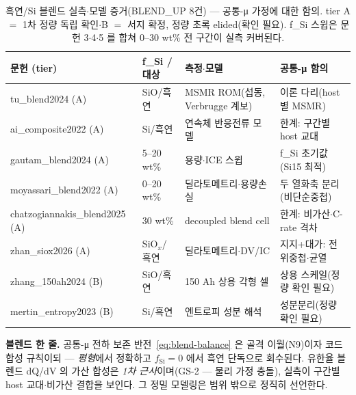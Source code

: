 \begin{table}[h]
\centering\footnotesize
\renewcommand{\arraystretch}{1.3}
\caption{흑연/Si 블렌드 실측$\cdot$모델 증거(BLEND\_UP 8건) --- 공통-μ 가정에 대한 함의. tier A $=$ 1차
정량 독립 확인$\cdot$B $=$ 서지 확정, 정량 초록 elided(확인 필요). f\_Si 스윕은 문헌 3$\cdot$4$\cdot$5 를
합쳐 $0$--$30$ wt\% 전 구간이 실측 커버된다.}
\label{tab:blend-evidence}
\begin{tabular}{@{}p{} p{} p{} p{}@{}}
\toprule
문헌 (tier) & f\_Si / 대상 & 측정$\cdot$모델 & 공통-μ 함의 \\
\midrule
tu\_blend2024 (A)            & SiO/흑연  & MSMR ROM(섭동, Verbrugge 계보) & 이론 다리(host별 MSMR) \\
ai\_composite2022 (A)        & Si/흑연   & 연속체 반응전류 모델            & 한계: 구간별 host 교대 \\
gautam\_blend2024 (A)        & 5--20 wt\%& 용량$\cdot$ICE 스윕            & f\_Si 초기값(Si15 최적) \\
moyassari\_blend2022 (A)     & 0--20 wt\%& 딜라토메트리$\cdot$용량손실     & 두 열화축 분리(비단순중첩) \\
chatzogiannakis\_blend2025 (A)& 30 wt\%   & decoupled blend cell          & 한계: 비가산$\cdot$C-rate 격차 \\
zhan\_siox2026 (A)           & SiO$_x$/흑연& 딜라토메트리$\cdot$DV/IC       & 지지+대가: 전위중첩$\cdot$균열 \\
zhang\_150ah2024 (B)         & SiO/흑연  & 150 Ah 상용 각형 셀           & 상용 스케일(정량 확인 필요) \\
mertin\_entropy2023 (B)      & Si/흑연   & 엔트로피 성분 해석             & 성분분리(정량 확인 필요) \\
\bottomrule
\end{tabular}
\end{table}

\begin{keybox}
\textbf{블렌드 한 줄.} 공통-μ 전하 보존 반전~\eqref{eq:blend-balance} 은 골격 이월(N9)이자 코드 합성
규칙이되 --- \emph{평형}에서 정확하고 $f_\mathrm{Si}{=}0$ 에서 흑연 단독으로 회수된다. 유한율 블렌드
dQ/dV 의 가산 합성은 \emph{1차 근사}이며(GS-2 --- 물리 가정 충돌), 실측이 구간별 host
교대\cite{ai_composite2022}$\cdot$비가산 결합\cite{chatzogiannakis_blend2025}을 보인다. 그 정밀 모델링은
범위 밖으로 정직히 선언한다.
\end{keybox}

